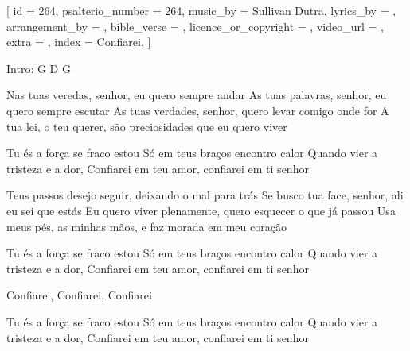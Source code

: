 [
    id                     = {264},
    psalterio_number       = {264},
    music_by               = {Sullivan Dutra},
    lyrics_by              = {},
    arrangement_by         = {},
    bible_verse            = {},
    licence_or_copyright   = {},
    video_url              = {},
    extra                  = {},
    index                  = {Confiarei},
]

\beginverse
Intro: G D G
\endverse

\beginverse
Nas tuas veredas, senhor, eu quero sempre andar
As tuas palavras, senhor, eu quero sempre escutar
As tuas verdades, senhor, quero levar comigo onde for
A tua lei, o teu querer, são preciosidades que eu quero viver
\endverse


\beginchorus
Tu és a força se fraco estou
Só em teus braços encontro calor
Quando vier a tristeza e a dor,
Confiarei em teu amor, confiarei em ti senhor
\endchorus


\beginverse
Teus passos desejo seguir, deixando o mal para trás
Se busco tua face, senhor, ali eu sei que estás
Eu quero viver plenamente, quero esquecer o que já passou
Usa meus pés, as minhas mãos, e faz morada em meu coração
\endverse


\beginchorus
Tu és a força se fraco estou
Só em teus braços encontro calor
Quando vier a tristeza e a dor,
Confiarei em teu amor, confiarei em ti senhor
\endchorus


\beginverse
Confiarei, Confiarei, Confiarei
\endverse


\beginchorus
Tu és a força se fraco estou
Só em teus braços encontro calor
Quando vier a tristeza e a dor,
Confiarei em teu amor, confiarei em ti senhor
\endchorus

\endsong
